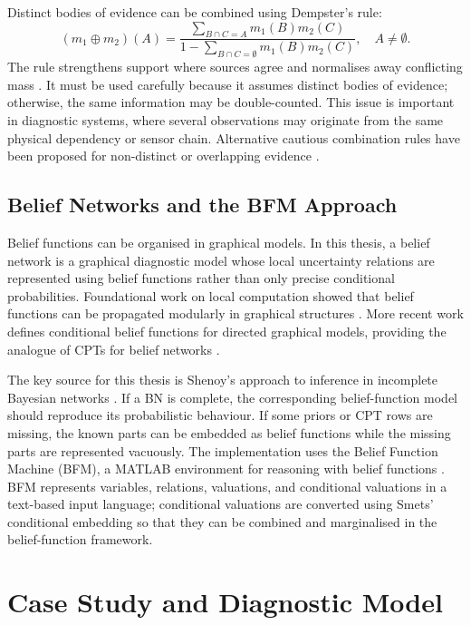 \documentclass[runningheads]{llncs}
\begin{document}
Distinct bodies of evidence can be combined using Dempster's rule:
\begin{equation}
(m_1\oplus m_2)(A)=\frac{\sum_{B\cap C=A}m_1(B)m_2(C)}{1-\sum_{B\cap C=\emptyset}m_1(B)m_2(C)}, \quad A\neq\emptyset.
\end{equation}
The rule strengthens support where sources agree and normalises away conflicting mass \cite{Shafer1976}. It must be used carefully because it assumes distinct bodies of evidence; otherwise, the same information may be double-counted. This issue is important in diagnostic systems, where several observations may originate from the same physical dependency or sensor chain. Alternative cautious combination rules have been proposed for non-distinct or overlapping evidence \cite{Denoeux2008,Shenoy2023DistinctBeliefFunctions}.


\subsection{Belief Networks and the BFM Approach}
\label{sec:belief_networks_bfm}

Belief functions can be organised in graphical models. In this thesis, a belief network is a graphical diagnostic model whose local uncertainty relations are represented using belief functions rather than only precise conditional probabilities. Foundational work on local computation showed that belief functions can be propagated modularly in graphical structures \cite{ShaferShenoyMellouli1987}. More recent work defines conditional belief functions for directed graphical models, providing the analogue of CPTs for belief networks \cite{JirousekKratochvilShenoy2023}.

The key source for this thesis is Shenoy's approach to inference in incomplete Bayesian networks \cite{Shenoy2023IncompleteBN}. If a BN is complete, the corresponding belief-function model should reproduce its probabilistic behaviour. If some priors or CPT rows are missing, the known parts can be embedded as belief functions while the missing parts are represented vacuously. The implementation uses the Belief Function Machine (BFM), a MATLAB environment for reasoning with belief functions \cite{GiangShenoy2003BFM}. BFM represents variables, relations, valuations, and conditional valuations in a text-based input language; conditional valuations are converted using Smets' conditional embedding so that they can be combined and marginalised in the belief-function framework.

\section{Case Study and Diagnostic Model}
\label{sec:case_study_diagnostic_model}
\end{document}
